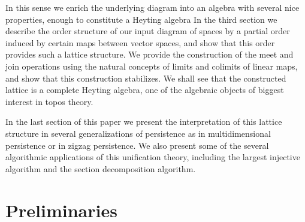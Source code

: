 \documentclass[10pt]{amsart}
\begin{document}
\begin{center}
\end{center}

In this sense we enrich the underlying diagram into an algebra with several nice properties, enough to constitute a Heyting algebra
In the third section we describe the order structure of our input diagram of spaces by a partial order induced by certain maps between vector spaces, and show that this order provides such a lattice structure.
We provide the construction of the meet and join operations using the natural concepts of limits and colimits of linear maps, and show that this construction stabilizes.  
We shall see that the constructed lattice is a complete Heyting algebra, one of the algebraic objects of biggest interest in topos theory.

In the last section of this paper we present the interpretation of this lattice structure in several generalizations of persistence as in multidimensional persistence or in zigzag persistence.
We also present some of the several algorithmic applications of this unification theory, including the largest injective algorithm and the section decomposition algorithm.




%
\section{Preliminaries}
\label{Preliminaries}
\end{document}
